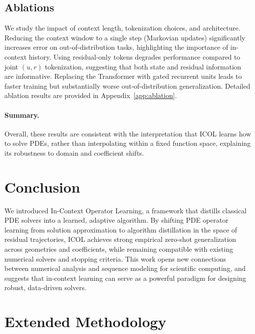 \documentclass{article}
\begin{document}
\subsection{Ablations}

We study the impact of context length, tokenization choices, and architecture. Reducing the context window to a single step (Markovian updates) significantly increases error on out-of-distribution tasks, highlighting the importance of in-context history. Using residual-only tokens degrades performance compared to joint $(u,r)$ tokenization, suggesting that both state and residual information are informative. Replacing the Transformer with gated recurrent units leads to faster training but substantially worse out-of-distribution generalization. Detailed ablation results are provided in Appendix~\ref{app:ablation}.

\paragraph{Summary.}
Overall, these results are consistent with the interpretation that ICOL learns how to solve PDEs, rather than interpolating within a fixed function space, explaining its robustness to domain and coefficient shifts.

\section{Conclusion}

We introduced In-Context Operator Learning, a framework that distills classical PDE solvers into a learned, adaptive algorithm. By shifting PDE operator learning from solution approximation to algorithm distillation in the space of residual trajectories, ICOL achieves strong empirical zero-shot generalization across geometries and coefficients, while remaining compatible with existing numerical solvers and stopping criteria. This work opens new connections between numerical analysis and sequence modeling for scientific computing, and suggests that in-context learning can serve as a powerful paradigm for designing robust, data-driven solvers.





\appendix

\section{Extended Methodology}
\label{app:method}
\end{document}
